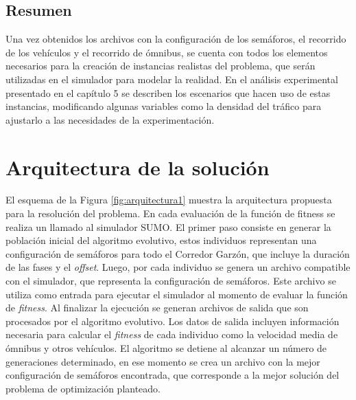\subsection{Resumen}

Una vez obtenidos los archivos con la configuración de los semáforos, el recorrido de los vehículos y el recorrido de ómnibus, se cuenta con todos los elementos necesarios para la creación de instancias realistas del problema, que serán utilizadas en el simulador para modelar la realidad.  En el análisis experimental presentado en el capítulo 5 se describen los escenarios que hacen uso de estas instancias, modificando algunas variables como la densidad del tráfico para ajustarlo a las necesidades de la experimentación.



\section{Arquitectura de la solución}



El esquema de la Figura \ref{fig:arquitectura1}  muestra la arquitectura propuesta para la resolución del problema. En cada evaluación de la función de fitness se realiza un llamado al simulador SUMO. El primer paso consiste en generar la población inicial del algoritmo evolutivo, estos individuos representan una configuración de semáforos para todo el Corredor Garzón, que incluye la duración de las fases y el \emph{offset}. Luego, por cada individuo se genera un archivo compatible con el simulador, que representa la configuración de semáforos. Este archivo se utiliza como entrada para ejecutar el simulador al momento de evaluar la función de \emph{fitness}. Al finalizar la ejecución se generan archivos de salida que son procesados por el algoritmo evolutivo. Los datos de salida incluyen información necesaria para calcular el \emph{fitness} de cada individuo como la velocidad media de ómnibus y otros vehículos. El algoritmo se detiene al alcanzar un número de generaciones determinado, en ese momento se crea un archivo con la mejor configuración de semáforos encontrada, que corresponde a la mejor solución del problema de optimización planteado. 




